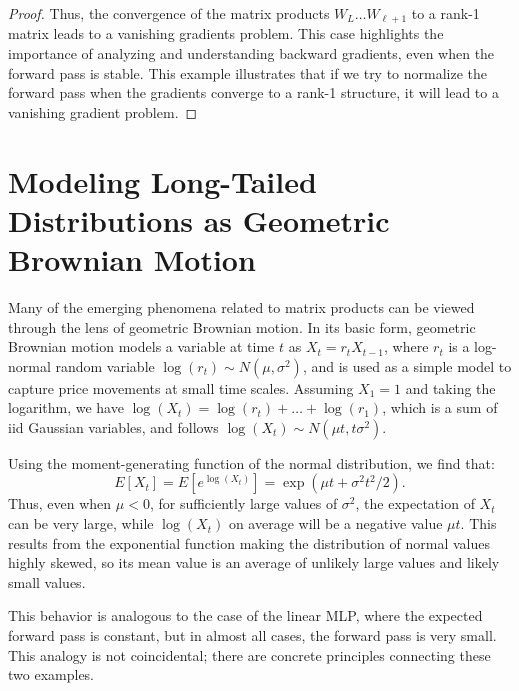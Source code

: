 \begin{proof}
Thus, the convergence of the matrix products \( W_L \dots W_{\ell+1} \) to a rank-1 matrix leads to a vanishing gradients problem. This case highlights the importance of analyzing and understanding backward gradients, even when the forward pass is stable. This example illustrates that if we try to normalize the forward pass when the gradients converge to a rank-1 structure, it will lead to a vanishing gradient problem.
\end{proof}


\section{Modeling Long-Tailed Distributions as Geometric Brownian Motion}

\begin{remark}
Many of the emerging phenomena related to matrix products can be viewed through the lens of geometric Brownian motion. In its basic form, geometric Brownian motion models a variable at time \( t \) as \( X_{t} = r_t X_{t-1} \), where \( r_t \) is a log-normal random variable \( \log(r_t) \sim N(\mu, \sigma^2) \), and is used as a simple model to capture price movements at small time scales. Assuming \( X_1=1 \) and taking the logarithm, we have \( \log(X_t) = \log(r_t) + \dots + \log(r_1) \), which is a sum of iid Gaussian variables, and follows \( \log(X_t) \sim N(\mu t, t\sigma^2) \).
\end{remark}

\begin{theorem}
Using the moment-generating function of the normal distribution, we find that:
\begin{equation}
E[X_t] = E[e^{\log(X_t)}] = \exp(\mu t + \sigma^2 t^2 / 2).
\end{equation}
Thus, even when \( \mu < 0 \), for sufficiently large values of \( \sigma^2 \), the expectation of \( X_t \) can be very large, while \( \log(X_t) \) on average will be a negative value \( \mu t \). This results from the exponential function making the distribution of normal values highly skewed, so its mean value is an average of unlikely large values and likely small values.
\end{theorem}

\begin{remark}
This behavior is analogous to the case of the linear MLP, where the expected forward pass is constant, but in almost all cases, the forward pass is very small. This analogy is not coincidental; there are concrete principles connecting these two examples.
\end{remark}

